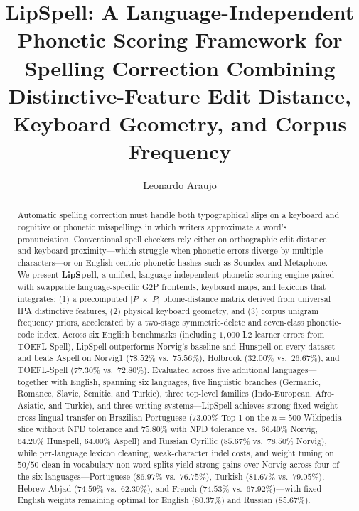 \documentclass[
  journal=nlp,
  manuscript=research-article,
  year=2026,
]{cup-journal}
\title{LipSpell: A Language-Independent Phonetic Scoring Framework for Spelling Correction Combining Distinctive-Feature Edit Distance, Keyboard Geometry, and Corpus Frequency}
\author{Leonardo Araujo}
\affiliation{Department of Computer Science, Universidade Federal de S\~ao Jo\~ao del-Rei (UFSJ), S\~ao Jo\~ao del-Rei, MG, Brazil}
\begin{document}
\begin{abstract}
Automatic spelling correction must handle both typographical slips on a keyboard and cognitive or phonetic misspellings in which writers approximate a word's pronunciation. Conventional spell checkers rely either on orthographic edit distance and keyboard proximity---which struggle when phonetic errors diverge by multiple characters---or on English-centric phonetic hashes such as Soundex and Metaphone. We present \textbf{LipSpell}, a unified, language-independent phonetic scoring engine paired with swappable language-specific G2P frontends, keyboard maps, and lexicons that integrates: (1) a precomputed $|P|\times|P|$ phone-distance matrix derived from universal IPA distinctive features, (2) physical keyboard geometry, and (3) corpus unigram frequency priors, accelerated by a two-stage symmetric-delete and seven-class phonetic-code index. Across six English benchmarks (including $1{,}000$ L2 learner errors from TOEFL-Spell), LipSpell outperforms Norvig's baseline and Hunspell on every dataset and beats Aspell on Norvig1 ($78.52\%$ vs.\ $75.56\%$), Holbrook ($32.00\%$ vs.\ $26.67\%$), and TOEFL-Spell ($77.30\%$ vs.\ $72.80\%$). Evaluated across five additional languages---together with English, spanning six languages, five linguistic branches (Germanic, Romance, Slavic, Semitic, and Turkic), three top-level families (Indo-European, Afro-Asiatic, and Turkic), and three writing systems---LipSpell achieves strong fixed-weight cross-lingual transfer on Brazilian Portuguese ($73.00\%$ Top-1 on the $n=500$ Wikipedia slice without NFD tolerance and $75.80\%$ with NFD tolerance vs.\ $66.40\%$ Norvig, $64.20\%$ Hunspell, $64.00\%$ Aspell) and Russian Cyrillic ($85.67\%$ vs.\ $78.50\%$ Norvig), while per-language lexicon cleaning, weak-character indel costs, and weight tuning on $50/50$ clean in-vocabulary non-word splits yield strong gains over Norvig across four of the six languages---Portuguese ($86.97\%$ vs.\ $76.75\%$), Turkish ($81.67\%$ vs.\ $79.05\%$), Hebrew Abjad ($74.59\%$ vs.\ $62.30\%$), and French ($74.53\%$ vs.\ $67.92\%$)---with fixed English weights remaining optimal for English ($80.37\%$) and Russian ($85.67\%$).
\end{abstract}
\end{document}
